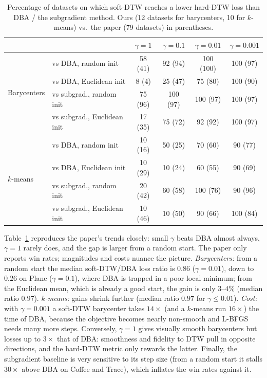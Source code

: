 \begin{table}[t]
\centering\small
\caption{Percentage of datasets on which soft-DTW reaches a lower hard-DTW loss than DBA / the subgradient method. Ours (12 datasets for barycenters, 10 for $k$-means) vs.\ the paper (79 datasets) in parentheses.}
\label{tab:repro}
\setlength{\tabcolsep}{4pt}
\begin{tabular}{llcccc}
\toprule
& & $\gamma=1$ & $\gamma=0.1$ & $\gamma=0.01$ & $\gamma=0.001$ \\
\midrule
\multirow{4}{*}{Barycenters}
& vs DBA, random init & 58 (41) & 92 (94) & 100 (100) & 100 (97) \\
& vs DBA, Euclidean init & 8 (4) & 25 (47) & 75 (80) & 100 (90) \\
& vs subgrad., random init & 75 (96) & 100 (97) & 100 (97) & 100 (97) \\
& vs subgrad., Euclidean init & 17 (35) & 75 (72) & 92 (92) & 100 (97) \\
\midrule
\multirow{4}{*}{$k$-means}
& vs DBA, random init & 10 (16) & 50 (25) & 70 (60) & 90 (77) \\
& vs DBA, Euclidean init & 10 (29) & 10 (24) & 60 (55) & 90 (69) \\
& vs subgrad., random init & 20 (42) & 60 (58) & 100 (76) & 90 (96) \\
& vs subgrad., Euclidean init & 10 (46) & 10 (50) & 90 (66) & 100 (84) \\
\bottomrule
\end{tabular}
\end{table}

Table~\ref{tab:repro} reproduces the paper's trends closely: small $\gamma$ beats DBA almost always, $\gamma=1$ rarely does, and the gap is larger from a random start. The paper only reports win rates; magnitudes and costs nuance the picture. \emph{Barycenters:} from a random start the median soft-DTW/DBA loss ratio is $0.86$ ($\gamma=0.01$), down to $0.26$ on Plane ($\gamma=0.1$), where DBA is trapped in a poor local minimum; from the Euclidean mean, which is already a good start, the gain is only $3$--$4\%$ (median ratio $0.97$). \emph{$k$-means:} gains shrink further (median ratio $0.97$ for $\gamma\le0.01$). \emph{Cost:} with $\gamma=0.001$ a soft-DTW barycenter takes $14\times$ (and a $k$-means run $16\times$) the time of DBA, because the objective becomes nearly non-smooth and L-BFGS needs many more steps. Conversely, $\gamma=1$ gives visually smooth barycenters but losses up to $3\times$ that of DBA: smoothness and fidelity to DTW pull in opposite directions, and the hard-DTW metric only rewards the latter. Finally, the subgradient baseline is very sensitive to its step size (from a random start it stalls $30\times$ above DBA on Coffee and Trace), which inflates the win rates against it.

